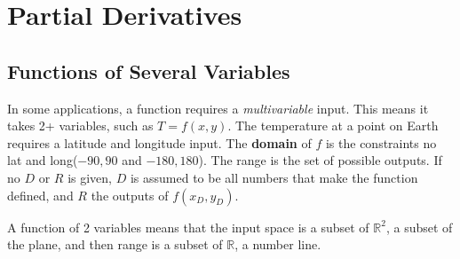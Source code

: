 \documentclass{article}
\begin{document}
\section{Partial Derivatives}
\subsection{Functions of Several Variables}
In some applications, a function requires a \textit{multivariable} input. This means it takes 2+ variables, such as $T = f(x,y)$. The temperature at a point on Earth requires a latitude and longitude input. The \textbf{domain} of $f$ is the constraints no lat and long($-90,90$ and $-180,180$). The range is the set of possible outputs. If no $D$ or $R$ is given, $D$ is assumed to be all numbers that make the function defined, and $R$ the outputs of $f(x_D,y_D)$.

A function of 2 variables means that the input space is a subset of $\mathbb{R}^2$, a subset of the plane, and then range is a subset of $\mathbb{R}$, a number line.
\end{document}
